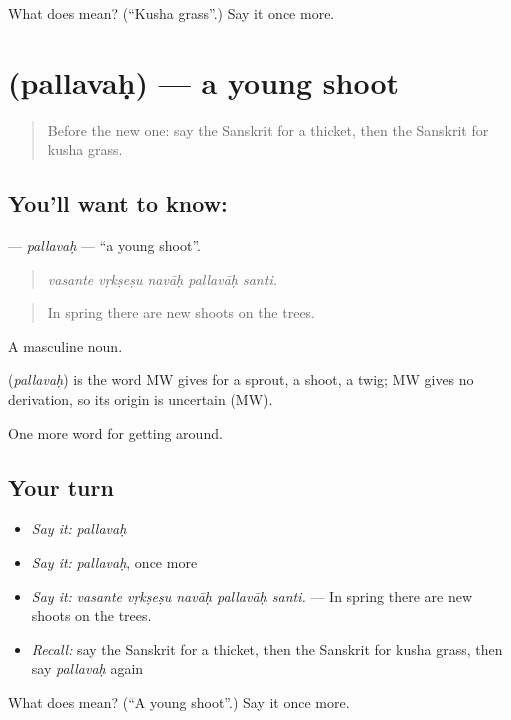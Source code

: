 \begin{tcolorbox}[breakable,colback=teal!4,colframe=teal!35!black,title={Before you move on}]
What does  mean? (\textquotedblleft{}Kusha grass\textquotedblright{}.) Say it once more.
\end{tcolorbox}
\section[\texorpdfstring{\sk{पल्लवः} (pallavaḥ)}{पल्लवः (pallavaḥ)}]{ (pallavaḥ) — a young shoot}

\label{lesson:SA-C446-pallavah}



\begin{quote}
Before the new one: say the Sanskrit for a thicket, then the Sanskrit for kusha grass.
\end{quote}

\subsection*{You'll want to know: }
\textbf{} — \emph{pallavaḥ} — \textquotedblleft{}a young shoot\textquotedblright{}.

\begin{quote}
    
\end{quote}

\begin{quote}
\emph{vasante vṛkṣeṣu navāḥ pallavāḥ santi.}
\end{quote}

\begin{quote}
In spring there are new shoots on the trees.
\end{quote}

A masculine noun.

\begin{cousinweb}
\textbf{} (\emph{pallavaḥ}) is the word MW gives for a sprout, a shoot, a twig; MW gives no derivation, so its origin is uncertain (MW).
\end{cousinweb}

\begin{grammarlens}[title={What you've built}]
One more word for getting around.
\end{grammarlens}

\subsection*{Your turn}
\begin{itemize}
\raggedright
  \item \emph{Say it:} \emph{pallavaḥ}
  \item \emph{Say it:} \emph{pallavaḥ}, once more
  \item \emph{Say it:} \emph{vasante vṛkṣeṣu navāḥ pallavāḥ santi.} — In spring there are new shoots on the trees.
  \item \emph{Recall:} say the Sanskrit for a thicket, then the Sanskrit for kusha grass, then say \emph{pallavaḥ} again
\end{itemize}

\begin{tcolorbox}[breakable,colback=teal!4,colframe=teal!35!black,title={Before you move on}]
What does  mean? (\textquotedblleft{}A young shoot\textquotedblright{}.) Say it once more.
\end{tcolorbox}
